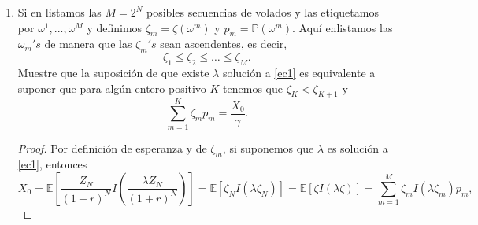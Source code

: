 \documentclass[letterpaper]{article}
\newcommand{\E}{\mathbb{E}}
\renewcommand{\P}{\mathbb{P}}
\newcommand{\1}{\mathds{1}}
\theoremstyle{definition}
\theoremstyle{definition}
\theoremstyle{definition}
\theoremstyle{definition}
\theoremstyle{definition}
\begin{document}
\begin{enumerate}
\begin{enumerate}
\begin{proof}
          \begin{align*}
            \E\left[U(X_N)\right] -&\E\left[X_N\frac{\lambda Z}{(1+r)^N}\right] \leq \E\left[U\left(I\left(\frac{\lambda Z}{(1+r)^N}\right)\right)\right] - \E\left[\frac{\lambda Z}{(1+r)^N}I \left(\frac{\lambda Z}{(1+r)^N}\right)\right]\\
            &\Longleftrightarrow \E\left[U(X_N)\right] -\lambda\E\left[X_N\frac{Z}{(1+r)^N}\right] \leq \E\left[U\left(I\left(\frac{\lambda Z}{(1+r)^N}\right)\right)\right] - \lambda\E\left[\frac{Z}{(1+r)^N}I \left(\frac{\lambda Z}{(1+r)^N}\right)\right]\\
            &\Longleftrightarrow \E\left[U(X_N)\right] -\lambda\tilde{\E}\left[\frac{X_N}{(1+r)^N}\right] \leq \E\left[U\left(X_N^*\right)\right] - \lambda X_0\\
            &\Longleftrightarrow \E\left[U(X_N)\right] -\lambda X_0 \leq \E\left[U\left(X_N^*\right)\right] - \lambda X_0\\
            &\Longleftrightarrow \E\left[U(X_N)\right] \leq \E\left[U\left(X_N^*\right)\right]\\
            &\Longleftrightarrow \E\left[\1_{[\gamma,\infty)}(X_N)\right]\leq \E\left[\1_{[\gamma,\infty)}(X_N^{*})\right]\\
            &\Longleftrightarrow \P\left(X_N\geq \gamma\right) \leq \P\left(X_N^{*}\geq \gamma\right),
          \end{align*}
          tal y como queríamos. Por lo tanto, la variable $X_N^*$ dada por la expresión anterior en efecto maximiza 
          la probabilidad buscada.
        \end{proof}
    \item Si en listamos las $M=2^{N}$ posibles secuencias de volados y las etiquetamos por $\omega^1,...,\omega^M$ y 
    definimos $\zeta_m=\zeta(\omega^{m})$ y $p_m=\P(\omega^m)$. Aquí enlistamos las $\omega_m's$ de 
    manera que las $\zeta_m's$ sean ascendentes, es decir,
    \[
     \zeta_1\leq\zeta_2\leq\dots\leq \zeta_M.    
    \]
    Muestre que la suposición de que existe $\lambda$ solución a \eqref{ec1} es equivalente a suponer
    que para algún entero positivo $K$ tenemos que $\zeta_K<\zeta_{K+1}$ y 
    \[
    \sum_{m=1}^{K}\zeta_mp_m=\frac{X_0}{\gamma}.    
    \]
    \begin{proof} 
      Por definición de esperanza y de $\zeta_m$, si suponemos que $\lambda$ es solución a \eqref{ec1}, entonces
      \[
     X_0=\E\left[\frac{Z_N}{(1+r)^N}I \left(\frac{\lambda Z_N}{(1+r)^N}\right)\right]=\E\left[\zeta_N I(\lambda\zeta_N)\right]=\E\left[\zeta I(\lambda\zeta)\right]=\sum_{m=1}^{M}\zeta_mI(\lambda\zeta_m)p_m,
\]
\end{proof}
\end{enumerate}
\end{enumerate}
\end{document}
